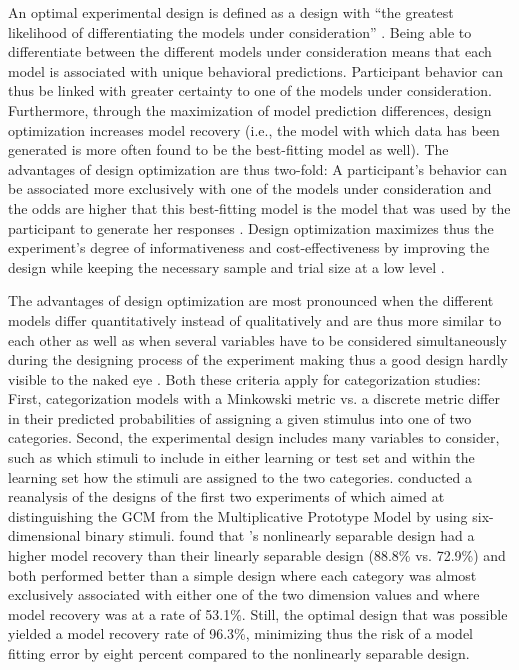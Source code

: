 \documentclass[a4paper,man,natbib]{apa6}
\begin{document}
An optimal experimental design is defined as a design with ``the greatest likelihood of differentiating the models under consideration'' \cite[][p. 500]{myung2009optimal}. Being able to differentiate between the different models under consideration means that each model is associated with unique behavioral predictions. Participant behavior can thus be linked with greater certainty to one of the models under consideration. Furthermore, through the maximization of model prediction differences, design optimization increases model recovery (i.e., the model with which data has been generated is more often found to be the best-fitting model as well). The advantages of design optimization are thus two-fold: A participant's behavior can be associated more exclusively with one of the models under consideration and the odds are higher that this best-fitting model is the model that was used by the participant to generate her responses \citep[albeit that each scientific model is only an approximation of the participant's cognitive model; see][]{myung2009optimal}. Design optimization maximizes thus the experiment's degree of informativeness and cost-effectiveness by improving the design while keeping the necessary sample and trial size at a low level \citep{cavagnaro2009better, ouyang2016practical, raffert2012optimally, atkinson2007optimum, nelson2005finding}. 

The advantages of design optimization are most pronounced when the different models differ quantitatively instead of qualitatively and are thus more similar to each other as well as when several variables have to be considered simultaneously during the designing process of the experiment making thus a good design hardly visible to the naked eye \citep{myung2009optimal}. Both these criteria apply for categorization studies: First, categorization models with a Minkowski metric vs. a discrete metric differ in their predicted probabilities of assigning a given stimulus into one of two categories. Second, the experimental design includes many variables to consider, such as which stimuli to include in either learning or test set and within the learning set how the stimuli are assigned to the two categories. \cite{myung2009optimal} conducted a reanalysis of the designs of the first two experiments of \cite{smith1998prototypes} which aimed at distinguishing the GCM \citep{nosofsky1986attention} from the Multiplicative Prototype Model \citep{smith1998prototypes} by using six-dimensional binary stimuli. \cite{myung2009optimal} found that \citeauthor{smith1998prototypes}'s nonlinearly separable design had a higher model recovery than their linearly separable design (88.8\% vs. 72.9\%) and both performed better than a simple design where each category was almost exclusively associated with either one of the two dimension values and where model recovery was at a rate of 53.1\%. Still, the optimal design that was possible yielded a model recovery rate of 96.3\%, minimizing thus the risk of a model fitting error by eight percent compared to the nonlinearly separable design.  
\end{document}
